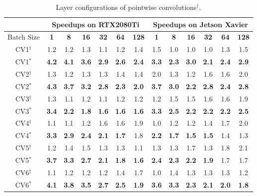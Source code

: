 \begin{table}[]
\setlength{\tabcolsep}{3.8pt}
\caption{Layer configurations of pointwise convolutions$^{\dag}$.}
\label{tab:pwconv}
\begin{threeparttable}
\begin{tabular}{c|cccccc|cccccc}
\toprule
&\multicolumn{6}{c|}{Speedups on RTX2080Ti} & \multicolumn{6}{c}{Speedups on Jetson Xavier}\\


\midrule
Batch Size& \textbf{1} & \textbf{8} & \textbf{16}& \textbf{32} & \textbf{64} & \textbf{128} & \textbf{1} & \textbf{8} & \textbf{16}& \textbf{32} & \textbf{64} & \textbf{128}\\
\hline
CV1$^{\dag}$&1.2 &1.2 &1.3 &1.1 &1.2 &1.4 &1.5 &1.0 &1.0 &1.0 &1.3 &1.5 \\
CV1$^{*}$&\textbf{4.2} &\textbf{4.1} &\textbf{3.6} &\textbf{2.9} &\textbf{2.6} &\textbf{2.4} &\textbf{3.3} &\textbf{2.3} &\textbf{3.0} &\textbf{2.1} &\textbf{2.4} &\textbf{2.9} \\
\hline
CV2$^{\dag}$&1.3 &1.2 &1.3 &1.3 &1.4 &1.4 &2.0 &1.3 &1.2 &1.6 &1.6 &2.0 \\
CV2$^{*}$&\textbf{4.3} &\textbf{3.7} &\textbf{3.2} &\textbf{2.8} &\textbf{2.3} &\textbf{2.0} &\textbf{3.7} &\textbf{3.0} &\textbf{2.2} &\textbf{2.8} &\textbf{2.4} &\textbf{2.8} \\
\hline
CV3$^{\dag}$&1.3 &1.1 &1.2 &1.1 &1.2 &1.2 &1.2 &1.5 &1.5 &1.6 &1.6 &1.9 \\
CV3$^{*}$&\textbf{3.4} &\textbf{2.2} &\textbf{1.8} &\textbf{1.6} &\textbf{1.6} &\textbf{1.6} &\textbf{3.3} &\textbf{2.5} &\textbf{2.2} &\textbf{2.2} &\textbf{2.2} &\textbf{2.5} \\
\hline
CV4$^{\dag}$&1.1 &1.1 &1.2 &1.6 &1.6 &1.9 &1.0 &1.2 &1.2 &1.4 &1.7 &2.0 \\
CV4$^{*}$&\textbf{3.3} &\textbf{2.9} &\textbf{2.4} &\textbf{2.1} &\textbf{1.7} &1.8 &\textbf{2.2} &\textbf{1.7} &\textbf{1.5} &\textbf{1.5} &1.4 &1.3 \\
\hline
CV5$^{\dag}$&1.2 &1.4 &1.5 &1.3 &1.3 &1.1 &1.3 &1.3 &1.7 &1.3 &1.8 &2.1 \\
CV5$^{*}$&\textbf{3.7} &\textbf{3.3} &\textbf{2.7} &\textbf{2.1} &\textbf{1.8} &\textbf{1.6} &\textbf{2.4} &\textbf{2.3} &\textbf{2.2} &\textbf{1.9} &1.7 &1.7 \\
\hline
CV6$^{\dag}$&1.1 &1.2 &1.2 &1.2 &1.4 &1.7 &1.0 &1.4 &1.3 &1.3 &1.3 &1.2 \\
CV6$^{*}$&\textbf{4.1} &\textbf{3.8} &\textbf{3.5} &\textbf{2.7} &\textbf{2.5} &\textbf{1.9} &\textbf{3.6} &\textbf{3.3} &\textbf{2.3} &\textbf{2.1} &\textbf{2.0} &\textbf{1.8} \\

\end{tabular}
\end{threeparttable}
\end{table}
